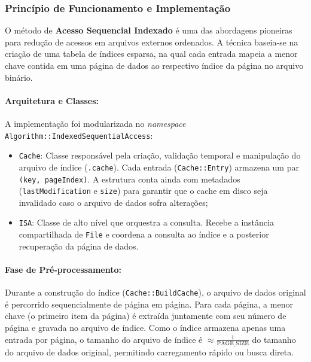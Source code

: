\documentclass[12pt,a4paper]{article}
\begin{document}
\subsubsection{Princípio de Funcionamento e Implementação}
O método de \textbf{Acesso Sequencial Indexado} é uma das abordagens pioneiras para redução de acessos em arquivos externos ordenados. A técnica baseia-se na criação de uma tabela de índices esparsa, na qual cada entrada mapeia a menor chave contida em uma página de dados ao respectivo índice da página no arquivo binário.

\paragraph{Arquitetura e Classes:}
A implementação foi modularizada no \textit{namespace} \texttt{Algorithm::}\allowbreak\texttt{IndexedSequentialAccess}:
\begin{itemize}
    \item \texttt{Cache}: Classe responsável pela criação, validação temporal e manipulação do arquivo de índice (\texttt{.cache}). Cada entrada (\texttt{Cache::Entry}) armazena um par \texttt{(key, pageIndex)}. A estrutura conta ainda com metadados (\texttt{lastModification} e \texttt{size}) para garantir que o cache em disco seja invalidado caso o arquivo de dados sofra alterações;
    \item \texttt{ISA}: Classe de alto nível que orquestra a consulta. Recebe a instância compartilhada de \texttt{File} e coordena a consulta ao índice e a posterior recuperação da página de dados.
\end{itemize}

\paragraph{Fase de Pré-processamento:}
Durante a construção do índice (\texttt{Cache::BuildCache}), o arquivo de dados original é percorrido sequencialmente de página em página. Para cada página, a menor chave (o primeiro item da página) é extraída juntamente com seu número de página e gravada no arquivo de índice. Como o índice armazena apenas uma entrada por página, o tamanho do arquivo de índice é $\approx \frac{1}{\text{PAGE\_SIZE}}$ do tamanho do arquivo de dados original, permitindo carregamento rápido ou busca direta.
\end{document}
